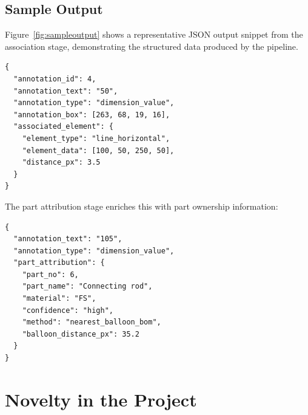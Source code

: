 \documentclass[12pt,a4paper]{article}
\begin{document}
\subsection{Sample Output}

Figure~\ref{fig:sampleoutput} shows a representative JSON output snippet from the association stage, demonstrating the structured data produced by the pipeline.

\begin{lstlisting}[caption={Sample association output for a dimension annotation}, label={fig:sampleoutput}]
{
  "annotation_id": 4,
  "annotation_text": "50",
  "annotation_type": "dimension_value",
  "annotation_box": [263, 68, 19, 16],
  "associated_element": {
    "element_type": "line_horizontal",
    "element_data": [100, 50, 250, 50],
    "distance_px": 3.5
  }
}
\end{lstlisting}

The part attribution stage enriches this with part ownership information:

\begin{lstlisting}[caption={Sample part attribution output}]
{
  "annotation_text": "105",
  "annotation_type": "dimension_value",
  "part_attribution": {
    "part_no": 6,
    "part_name": "Connecting rod",
    "material": "FS",
    "confidence": "high",
    "method": "nearest_balloon_bom",
    "balloon_distance_px": 35.2
  }
}
\end{lstlisting}

\section{Novelty in the Project}
\end{document}
